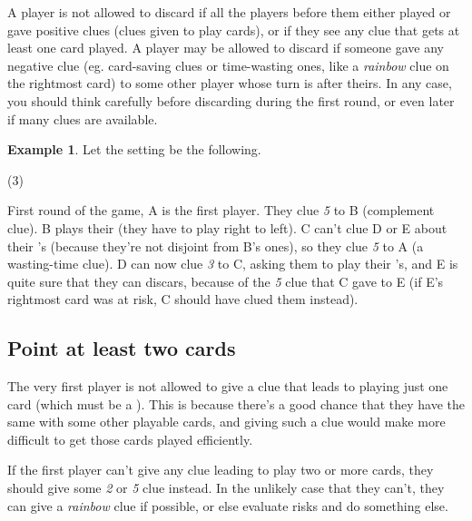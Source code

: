 \documentclass[a4paper]{article}
\theoremstyle{plain}
\theoremstyle{definition}
\newtheorem{example}[theorem]{Example}
\begin{document}
A player is not allowed to discard if all the players before them either played or gave positive clues (clues given to play cards), or if they see any clue that gets at least one card played. A player may be allowed to discard if someone gave any negative clue (eg. card-saving clues or time-wasting ones, like a \textit{rainbow} clue on the rightmost card) to some other player whose turn is after theirs. In any case, you should think carefully before discarding during the first round, or even later if many clues are available.

\begin{example}
	
	Let the setting be the following.
	
	\begin{tasks}(3)
		\task[+]      
		\task[A]    
		\task[B]    
		\task[C]    
		\task[D]    
		\task[E]    
	\end{tasks}
	
	First round of the game, A is the first player. They clue \textit{5} to B (complement clue). B plays their  (they have to play right to left). C can't clue D or E about their 's (because they're not disjoint from B's ones), so they clue \textit{5} to A (a wasting-time clue). D can now clue \textit{3} to C, asking them to play their 's, and E is quite sure that they can discars, because of the \textit{5} clue that C gave to E (if E's rightmost card was at risk, C should have clued them instead).
\end{example}

\subsection{Point at least two cards}

The very first player is not allowed to give a clue that leads to playing just one card (which must be a ). This is because there's a good chance that they have the same  with some other playable cards, and giving such a clue would make more difficult to get those cards played efficiently.

If the first player can't give any clue leading to play two or more cards, they should give some \textit{2} or \textit{5} clue instead. In the unlikely case that they can't, they can give a \textit{rainbow} clue if possible, or else evaluate risks and do something else.
\end{document}

